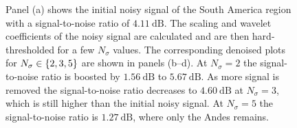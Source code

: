 \begin{figure}[htpb]
	\caption[
		A denoising demonstration for a map of South America
	]{
		Panel (a) shows the initial noisy signal of the South America region with a signal-to-noise ratio of \(\SI{4.11}{\dB}\).
		The scaling and wavelet coefficients of the noisy signal are calculated and are then hard-thresholded for a few \(N_{\sigma}\) values.
		The corresponding denoised plots for \(N_{\sigma} \in \{2, 3, 5\}\) are shown in panels (b--d). %
		At \(N_{\sigma}=2\) the signal-to-noise ratio is boosted by \(\SI{1.56}{\dB}\) to \(\SI{5.67}{\dB}\).
		As more signal is removed the signal-to-noise ratio decreases to \(\SI{4.60}{\dB}\) at \(N_{\sigma}=3\), which is still higher than the initial noisy signal.
		At \(N_{\sigma}=5\) the signal-to-noise ratio is \(\SI{1.27}{\dB}\), where only the Andes remains.
	}\label{fig:chapter4_denoising}
\end{figure}

